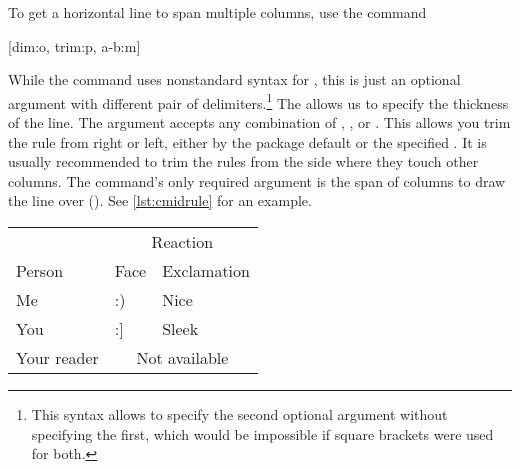 To get a horizontal line to span multiple columns, use the command
\begin{lscommand}
  [dim:o, trim:p, a-b:m]
\end{lscommand}
While the command uses nonstandard syntax for , this is just an
optional argument with different pair of delimiters.\footnote{This syntax
  allows to specify the second optional argument without specifying the first,
  which would be impossible if square brackets were used for both.} The
 allows us to specify the thickness of the line. The 
argument accepts any combination of , ,
 or . This allows you trim the rule from right
or left, either by the package default or the specified . It is
usually recommended to trim the rules from the side where they touch other
columns. The command's only required argument is the span of columns
to draw the line over (). See \autoref{lst:cmidrule} for an example.
\begin{listing}
  \begin{chktexignore}
  \begin{example}[examplewidth=0.85\linewidth, vertical_mode]
\begin{tabular}{@{}lll@{}}
  \toprule
              & \multicolumn{2}{c}{Reaction}      \\
  \cmidrule(l){2-3}
  Person      & Face & Exclamation                \\
  \midrule
  Me          & :)   & Nice                       \\
  You         & :]   & Sleek                      \\
  Your reader & \multicolumn{2}{c}{Not available} \\
  \bottomrule
\end{tabular}
\end{example}
\end{chktexignore}
  \caption{An example of using the  command inside a table.}\label{lst:cmidrule}
\end{listing}

